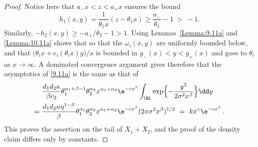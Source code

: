 \begin{proof}
Notice here that $a_-x<z<a_+x$ ensures the bound
\[ h_1(x,y)=\frac{1}{\theta_1x}(z-\theta_1x)\ge
\frac{a_-}{\theta_1}-1\ > \ -1.
\]
Similarly, $-h_2(x,y)\ge -a_+/\theta_2-1>1$. Using Lemmas~\ref{Lemma:9.11a} and \ref{Lemma:10.11a} shows that
so that the $\omega_i(x,y)$ are uniformly bounded below, and that
$\bigl(\theta_ix+e_i(\theta_ix)y\bigr)/x$ is bounded in $y_-(x)<y<y_+(x)$ and goes to $\theta_i$ as $x\to\infty$. A dominated convergence argument gives therefore that the asymptotics of \eqref{9.11a} is the same as that of
\begin{align*}& \frac{d_1d_2\kappa }{\beta c_2}\theta_1^{\alpha_1+\beta-1}\theta_2^{\alpha_2}x^{\alpha_1+\alpha_2}\e^{-cx^\beta}
 \int_{\RL}  \exp\Bigl\{-\frac{y^2}{2\sigma^2x^\beta}\Bigr\}\dd y\\ =\ &
 \frac{d_1d_2\kappa\eta^{1-\beta} }{\beta }\theta_1^{\alpha_1}\theta_2^{\alpha_2}x^{\alpha_1+\alpha_2}\e^{-cx^\beta}(2\pi \sigma^2 x^{\beta})^{1/2}\ =\
  k x^{\gamma} \e^{-cx^\beta} \,.
\end{align*}
This proves the assertion on the tail of $X_1+X_2$, and the proof of the density claim differs only by constants.
\end{proof}

